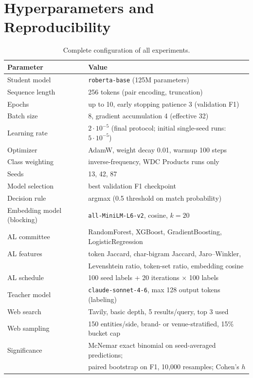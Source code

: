 \documentclass[a4paper,oneside,bibliography=totoc]{scrbook}
\begin{document}
\chapter{Hyperparameters and Reproducibility}
\label{app:hyperparams}

\begin{table}[!htbp]
  \centering
  \small
  \setlength{\tabcolsep}{2pt}
  \begin{tabular}{ll}
    \toprule
    \textbf{Parameter} & \textbf{Value} \\
    \midrule
    Student model & \texttt{roberta-base} (125M parameters) \\
    Sequence length & 256 tokens (pair encoding, truncation) \\
    Epochs & up to 10, early stopping patience 3 (validation F1) \\
    Batch size & 8, gradient accumulation 4 (effective 32) \\
    Learning rate & $2 \cdot 10^{-5}$ (final protocol; initial single-seed runs: $5 \cdot 10^{-5}$) \\
    Optimizer & AdamW, weight decay 0.01, warmup 100 steps \\
    Class weighting & inverse-frequency, WDC Products runs only \\
    Seeds & 13, 42, 87 \\
    Model selection & best validation F1 checkpoint \\
    Decision rule & argmax (0.5 threshold on match probability) \\
    \midrule
    Embedding model (blocking) & \texttt{all-MiniLM-L6-v2}, cosine, $k = 20$ \\
    AL committee & RandomForest, XGBoost, GradientBoosting, LogisticRegression \\
    AL features & token Jaccard, char-bigram Jaccard, Jaro--Winkler, \\
                & Levenshtein ratio, token-set ratio, embedding cosine \\
    AL schedule & 100 seed labels + 20 iterations $\times$ 100 labels \\
    Teacher model & \texttt{claude-sonnet-4-6}, max 128 output tokens (labeling) \\
    Web search & Tavily, basic depth, 5 results/query, top 3 used \\
    Web sampling & 150 entities/side, brand- or venue-stratified, 15\% bucket cap \\
    \midrule
    Significance & McNemar exact binomial on seed-averaged predictions; \\
                 & paired bootstrap on F1, 10{,}000 resamples; Cohen's $h$ \\
    \bottomrule
  \end{tabular}
  \caption{Complete configuration of all experiments.}
  \label{tab:hyperparams}
\end{table}
\end{document}
